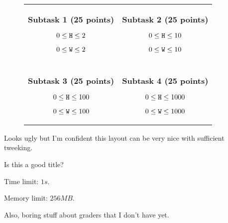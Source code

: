 \documentclass{boi2014}
\newcommand{\param}[1]{{\tt #1}}
\begin{document}
\Subtasks
\begin{figure}[H]
    \centering
    \begin{tabular}{cc}
        \begin{minipage}{0.4\textwidth}    
            \textbf{Subtask 1 (25 points)}
            \begin{description}
                \item $0 \le \param{H} \le 2$
                \item $0 \le \param{W} \le 2$
            \end{description}
        \end{minipage}
            &
        \begin{minipage}{0.4\textwidth}    
            \textbf{Subtask 2 (25 points)}
            \begin{description}
                \item $0 \le \param{H} \le 10$
                \item $0 \le \param{W} \le 10$
            \end{description}
        \end{minipage}
            \\ & \\
        \begin{minipage}{0.4\textwidth}    
            \textbf{Subtask 3 (25 points)}
            \begin{description}
                \item $0 \le \param{H} \le 100$
                \item $0 \le \param{W} \le 100$
            \end{description}
        \end{minipage}
            &
        \begin{minipage}{0.4\textwidth}    
            \textbf{Subtask 4 (25 points)}
            \begin{description}
                \item $0 \le \param{H} \le 1000$
                \item $0 \le \param{W} \le 1000$
            \end{description}
        \end{minipage}
    \end{tabular}
\end{figure}
\begin{todo}
    Looks ugly but I'm confident this layout can be very
    nice with sufficient tweeking.
\end{todo}

\Details
\begin{todo}
    Is this a good title?
\end{todo}

Time limit: $1s$.

Memory limit: $256 MB$.

\begin{todo}
    Also, boring stuff about graders that I don't have yet.
\end{todo}
\end{document}
